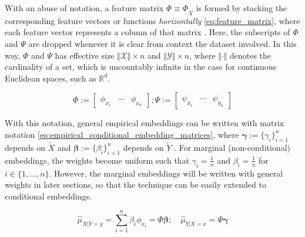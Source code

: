 \documentclass[twoside]{article} \usepackage{aistats2017}
\theoremstyle{definition}
\theoremstyle{theorem}
\newcommand{\rv}[1]{{#1}}
\newcommand{\ds}[1]{\tilde{#1}}
\newcommand{\hatmuYx}{\hat{\mu}_{\rv{Y} | \rv{X} = x}}
\newcommand{\hatmuXy}{\hat{\mu}_{\rv{X} | \rv{Y} = y}}
\newcommand{\cardX}{\Vert \mathcal{X} \Vert}
\newcommand{\cardY}{\Vert \mathcal{Y} \Vert}
\begin{document}
%			
%			
%			
			With an abuse of notation, a feature matrix $\Phi \equiv \Phi_{\ds{X}}$ is formed by stacking the corresponding feature vectors or functions \textit{horizontally} \eqref{eq:feature_matrix}, where each feature vector represents a column of that matrix  \citep{muandet2016kernel}. Here, the subscripts of $\Phi$ and $\Psi$ are dropped whenever it is clear from context the dataset involved. In this way, $\Phi$ and $\Psi$ has effective size $\cardX \times n$ and $\cardY \times n$, where $\Vert \cdot \Vert$ denotes the cardinality of a set, which is uncountably infinite in the case for continuous Euclidean spaces, such as $\mathbb{R}^{d}$.
				
			\begin{equation}
				\Phi := \begin{bmatrix} \phi_{x_{1}} & \cdots & \phi_{x_{n}} \end{bmatrix}; \Psi := \begin{bmatrix} \psi_{y_{1}} & \cdots & \psi_{y_{n}} \end{bmatrix}
			\label{eq:feature_matrix}
			\end{equation}
				

			With this notation, general empirical embeddings can be written with matrix notation \eqref{eq:empirical_conditional_embedding_matrices}, where $\bm{\gamma} := \{\gamma_{i}\}_{i = 1}^{n}$ depends on $\ds{X}$ and $\bm{\beta} := \{\beta_{i}\}_{i = 1}^{n}$ depends on $\ds{Y}$ \citep{muandet2016kernel}. For marginal (non-conditional) embeddings, the weights become uniform such that $\gamma_{i} = \frac{1}{n}$ and $\beta_{i} = \frac{1}{n}$ for $i \in \{1, \dots, n\}$. However, the marginal embeddings will be written with general weights in later sections, so that the technique can be easily extended to conditional embeddings.
			
			\begin{equation}
				\hatmuXy = \sum_{i = 1}^{n} \beta_{i} \phi_{x_{i}} = \Phi \bm{\beta} ;\quad \hatmuYx = \Psi \bm{\gamma}
			\label{eq:empirical_conditional_embedding_matrices}
			\end{equation}
		
\end{document}

